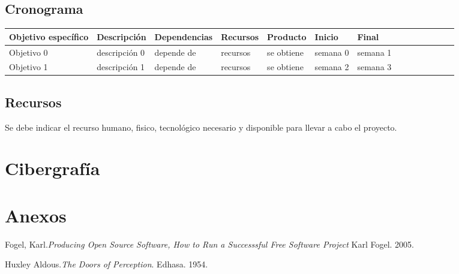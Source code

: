 \documentclass[a4paper, 11pt, oneside]{article}
\theoremstyle{definition}
\theoremstyle{remark}
\begin{document}
\begin{sidewaystable}
\begin{center}
\section{Cronograma}
\end{center}


\begin{center}

\begin{tabular}{l p{4cm} l p{4cm} l p{2cm} l p{2cm} l p{2cm} c p{2cm} c p{2cm} }
\toprule
\rowcolor[gray]{0.9}Objetivo específico & Descripción & Dependencias & Recursos  & Producto &
Inicio & Final \\
\midrule
Objetivo 0 & descripción 0 & depende de & recursos & se obtiene & semana 0 & semana 1 \\
\midrule
Objetivo 1 & descripción 1 & depende de & recursos & se obtiene & semana 2 & semana 3 \\
\bottomrule
\end{tabular}

\end{center}
\end{sidewaystable}
\clearpage

\begin{center}
\section{Recursos}
\end{center}
Se debe indicar el recurso humano, fisico, tecnológico necesario y disponible para llevar a cabo el
proyecto.
\clearpage

\begin{center}
\section{Cibergrafía}
\section{Anexos}
\end{center}
\clearpage




\begin{thebibliography}{99}


 Fogel, Karl.\emph{Producing Open Source Software, How to Run a
Successsful Free Software Project} Karl Fogel. 2005.

 Huxley Aldous.\emph{The Doors of Perception}. Edhasa. 1954.

\end{thebibliography}
\end{document}
